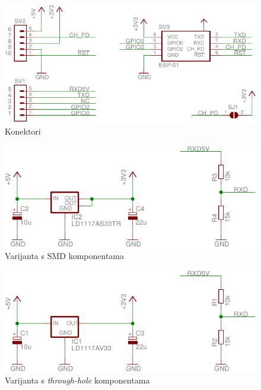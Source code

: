 \documentclass[times, utf8, zavrsni, numeric, sort]{fer}
\begin{document}
\begin{minipage}{1.0\textwidth}
	\centering
	\begin{subfigure}[b]{8cm}
		\centering
		\includegraphics[width=\textwidth]{./Sklopovi/ESP8266/esp8266-adapter-sch-conn.pdf}
		\caption{Konektori}
		\label{fig:esp8266-konektori}
	\end{subfigure}
	\begin{subfigure}[b]{8cm}
		\centering
		\includegraphics[width=\textwidth]{./Sklopovi/ESP8266/esp8266-adapter-sch-smd.pdf}
		\caption{Varijanta s SMD komponentama}
		\label{fig:esp8266-SMD}
	\end{subfigure}
	\begin{subfigure}[b]{8cm}
		\centering
		\includegraphics[width=\textwidth]{./Sklopovi/ESP8266/esp8266-adapter-sch-th.pdf}
		\caption{Varijanta s \textit{through-hole} komponentama}
		\label{fig:esp8266-TH}
	\end{subfigure}
\end{minipage}
\end{document}
